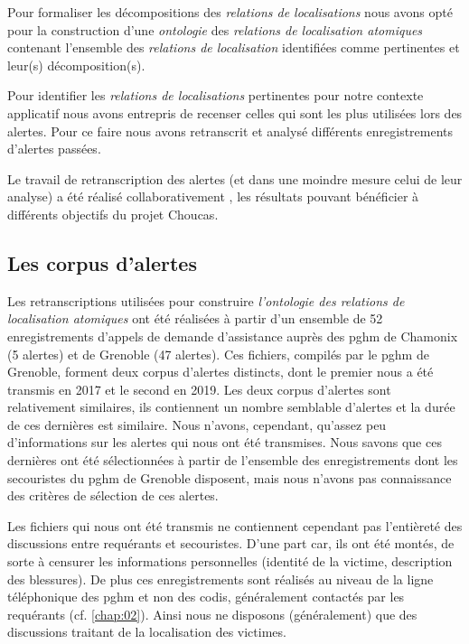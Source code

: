 Pour formaliser les décompositions des \emph{relations de
  localisations} nous avons opté pour la construction d'une
\emph{ontologie} des \emph{relations de localisation atomiques}
contenant l'ensemble des \emph{relations de localisation} identifiées
comme pertinentes et leur(s) décomposition(s).


Pour identifier les \emph{relations de localisations} pertinentes pour
notre contexte applicatif nous avons entrepris de recenser celles qui
sont les plus utilisées lors des alertes. Pour ce faire nous avons
retranscrit et analysé différents enregistrements d'alertes passées.

Le travail de retranscription des alertes (et dans une moindre mesure
celui de leur analyse) a été réalisé collaborativement
\autocite{Bunel2019}, les résultats pouvant bénéficier à différents
objectifs du projet Choucas.

\subsection{Les corpus d'alertes}

Les retranscriptions utilisées pour construire \emph{l'ontologie des
  relations de localisation atomiques} ont été réalisées à partir d'un
ensemble de 52 enregistrements d'appels de demande d'assistance auprès
des \ac{pghm} de Chamonix (5 alertes) et de Grenoble (47 alertes). Ces
fichiers, compilés par le \ac{pghm} de Grenoble, forment deux corpus
d'alertes distincts, dont le premier nous a été transmis en 2017 et le
second en 2019.
%
Les deux corpus d'alertes sont relativement similaires, ils
contiennent un nombre semblable d'alertes et la durée de ces dernières
est similaire. Nous n'avons, cependant, qu'assez peu d'informations
sur les alertes qui nous ont été transmises.
%
Nous savons que ces dernières ont été sélectionnées à partir de
l'ensemble des enregistrements dont les secouristes du \ac{pghm} de
Grenoble disposent, mais nous n'avons pas connaissance des critères de
sélection de ces alertes.

Les fichiers qui nous ont été transmis ne contiennent cependant pas
l'entièreté des discussions entre requérants et secouristes. D'une
part car, ils ont été montés, de sorte à censurer les informations
personnelles (\eg identité de la victime, description des
blessures). De plus ces enregistrements sont réalisés au niveau de la
ligne téléphonique des \ac{pghm} et non des \ac{codis}, généralement
contactés par les requérants (cf. \autoref{chap:02}). Ainsi nous ne
disposons (généralement) que des discussions traitant de la
localisation des victimes.



